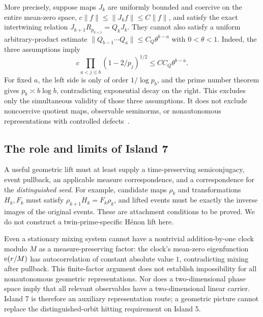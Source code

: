 More precisely, suppose maps $J_k$ are uniformly bounded and coercive on the entire mean-zero space,
$c\|f\|\le\|J_kf\|\le C\|f\|$, and satisfy the exact intertwining relation
$J_{k+1}R_{p_{k+1}}=Q_kJ_k$.
They cannot also satisfy a uniform arbitrary-product estimate
$\|Q_{b-1}\cdots Q_a\|\le C_Q\theta^{b-a}$ with $0<\theta<1$.
Indeed, the three assumptions imply
\[
c\prod_{a<j\le b}(1-2/p_j)^{1/2}\le CC_Q\theta^{b-a}.
\]
For fixed $a$, the left side is only of order $1/\log p_b$, and the prime number theorem gives $p_b\asymp b\log b$, contradicting exponential decay on the right.
This excludes only the simultaneous validity of those three assumptions. It does not exclude noncoercive quotient maps, observable seminorms, or nonautonomous representations with controlled defects~\cite{archiveintertwiner}.

\subsection{The role and limits of Island 7}
A useful geometric lift must at least supply a time-preserving semiconjugacy, event pullback, an applicable measure correspondence, and a correspondence for the \emph{distinguished seed}.
For example, candidate maps $\rho_k$ and transformations $H_k,F_k$ must satisfy
$\rho_{k+1}H_k=F_k\rho_k$, and lifted events must be exactly the inverse images of the original events.
These are attachment conditions to be proved. We do not construct a twin-prime-specific H\'enon lift here.

Even a stationary mixing system cannot have a nontrivial addition-by-one clock modulo $M$ as a measure-preserving factor: the clock's mean-zero eigenfunction $\mathrm e(r/M)$ has autocorrelation of constant absolute value $1$, contradicting mixing after pullback.
This finite-factor argument does not establish impossibility for all nonautonomous geometric representations.
Nor does a two-dimensional phase space imply that all relevant observables have a two-dimensional linear carrier.
Island 7 is therefore an auxiliary representation route; a geometric picture cannot replace the distinguished-orbit hitting requirement on Island 5.
